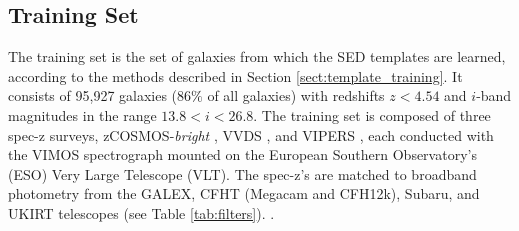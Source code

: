 \subsection{Training Set}

The training set is the set of galaxies from which the SED templates are learned, according to the methods described in Section \ref{sect:template_training}.
It consists of 95,927 galaxies ($86\%$ of all galaxies) with redshifts $z < 4.54$ and $i$-band magnitudes in the range $13.8 < i < 26.8$.
The training set is composed of three spec-z surveys, zCOSMOS-\textit{bright} \citep{Lilly2009a}, VVDS \citep{LeFevre2013b}, and VIPERS \citep{Scodeggio2018a}, each conducted with the VIMOS spectrograph mounted on the European Southern Observatory's (ESO) Very Large Telescope (VLT).
The spec-z's are matched to broadband photometry from the GALEX, CFHT (Megacam and CFH12k), Subaru, and UKIRT telescopes (see Table \ref{tab:filters}).
.

